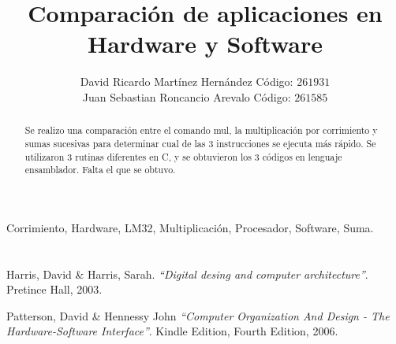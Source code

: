 \documentclass[twocolumn]{IEEEtran}
\begin{document}
\title{Comparación de aplicaciones en Hardware y Software}
\author{David Ricardo Martínez Hernández Código: $261931$\\
	Juan Sebastian Roncancio Arevalo Código: $261585$}
\maketitle
{}
\begin{abstract}
  Se realizo una comparación entre el comando mul, la multiplicación por corrimiento y sumas sucesivas para determinar cual de las 3 instrucciones se ejecuta más rápido. Se utilizaron 3 rutinas diferentes en C, y  se obtuvieron los 3 códigos en lenguaje ensamblador. Falta el que se obtuvo.
\end{abstract}

\begin{keywords}
 Corrimiento, Hardware, LM32, Multiplicación, Procesador, Software, Suma.
\end{keywords}

\section{}

\section{}


\begin{thebibliography}{99}
 Harris, David \& Harris, Sarah.
{\em "`Digital desing and computer architecture"'}.
Pretince Hall, 2003.

 Patterson, David \& Hennessy John
{\em "`Computer Organization And Design - The Hardware-Software Interface"'}.
Kindle Edition, Fourth Edition, 2006.

\end{thebibliography}
\end{document}
